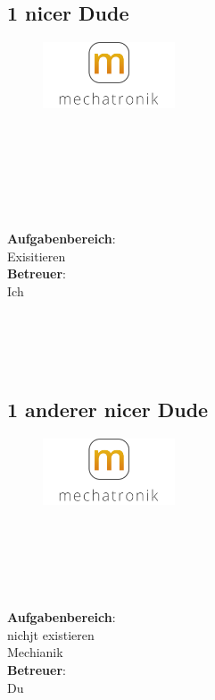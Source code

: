 \subsection*{1 nicer Dude}
\begin{figure}
\begin{center}
  \includegraphics[width=0.35\textwidth]{logoMecha}
\end{center}
\end{figure}
\mbox{}\\
\mbox{}\\
\mbox{}\\
\mbox{}\\
\mbox{}\\
\mbox{}\\
\textbf{Aufgabenbereich}:\\
Exisitieren\\
\textbf{Betreuer}:\\
Ich
\mbox{}\\
\mbox{}\\
\mbox{}\\
\mbox{}\\
\mbox{}\\

\subsection*{1 anderer nicer Dude}
\begin{figure}
\begin{center}
  \includegraphics[width=0.35\textwidth]{logoMecha}
\end{center}
\end{figure}
\mbox{}\\
\mbox{}\\
\mbox{}\\
\mbox{}\\
\mbox{}\\
\textbf{Aufgabenbereich}:\\
nichjt existieren\\
Mechianik\\
\textbf{Betreuer}:\\
Du